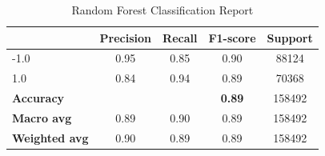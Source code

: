 \documentclass[11pt,letterpaper]{article}
\begin{document}
\begin{table}[H]
\centering
\begin{tabular}{lcccc}
\hline
\textbf{} & \textbf{Precision} & \textbf{Recall} & \textbf{F1-score} & \textbf{Support} \\
\hline
-1.0 & 0.95 & 0.85 & 0.90 & 88124 \\
1.0 & 0.84 & 0.94 & 0.89 & 70368 \\
\hline
\textbf{Accuracy} & & & \textbf{0.89} & 158492 \\
\textbf{Macro avg} & 0.89 & 0.90 & 0.89 & 158492 \\
\textbf{Weighted avg} & 0.90 & 0.89 & 0.89 & 158492 \\
\hline
\end{tabular}
\caption{Random Forest Classification Report}
\label{tab:classification_report1}
\end{table}
\end{document}
